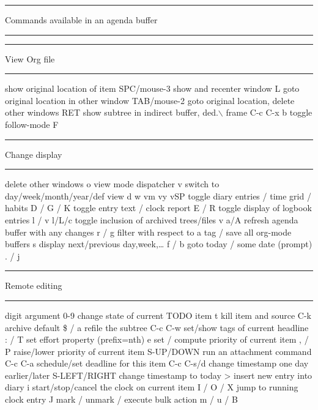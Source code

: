 \documentclass[10pt,a4paper]{article}
\begin{document}
\rule{\linewidth}{0.5pt}
Commands available in an agenda buffer

\rule{\linewidth}{0.5pt}

\rule{\linewidth}{0.5pt}
View Org file

\rule{\linewidth}{0.5pt}

show original location of item                    SPC/mouse-3
show and recenter window                          L
goto original location in other window            TAB/mouse-2
goto original location, delete other windows      RET
show subtree in indirect buffer, ded.$\backslash$ frame      C-c C-x b
toggle follow-mode                                F

\rule{\linewidth}{0.5pt}
Change display

\rule{\linewidth}{0.5pt}

delete other windows                              o
view mode dispatcher                              v
switch to day/week/month/year/def view            d w vm vy vSP
toggle diary entries / time grid / habits         D / G / K
toggle entry text / clock report                  E / R
toggle display of logbook entries                 l / v l/L/c
toggle inclusion of archived trees/files          v a/A
refresh agenda buffer with any changes            r / g
filter with respect to a tag                      /
save all org-mode buffers                         s
display next/previous day,week,\ldots{}                f / b
goto today / some date (prompt)                   . / j

\rule{\linewidth}{0.5pt}
Remote editing

\rule{\linewidth}{0.5pt}

digit argument                                    0-9
change state of current TODO item                 t
kill item and source                              C-k
archive default                                   \$ / a
refile the subtree                                C-c C-w
set/show tags of current headline                 : / T
set effort property (prefix=nth)                  e
set / compute priority of current item            , / P
raise/lower priority of current item              S-UP/DOWN\notetwo
run an attachment command                         C-c C-a
schedule/set deadline for this item               C-c C-s/d
change timestamp one day earlier/later            S-LEFT/RIGHT\notetwo
change timestamp to today                         >
insert new entry into diary                       i
start/stop/cancel the clock on current item       I / O / X
jump to running clock entry                       J
mark / unmark / execute bulk action               m / u / B
\end{document}
